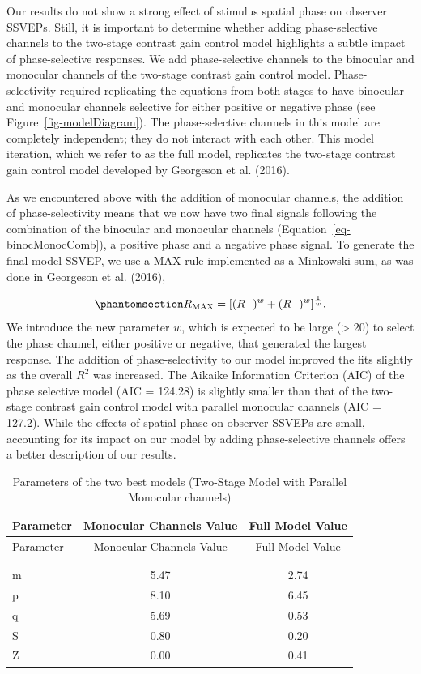\documentclass[
  12pt,
]{article}
\begin{document}
Our results do not show a strong effect of stimulus spatial phase on
observer SSVEPs. Still, it is important to determine whether adding
phase-selective channels to the two-stage contrast gain control model
highlights a subtle impact of phase-selective responses. We add
phase-selective channels to the binocular and monocular channels of the
two-stage contrast gain control model. Phase-selectivity required
replicating the equations from both stages to have binocular and
monocular channels selective for either positive or negative phase (see
Figure~\ref{fig-modelDiagram}). The phase-selective channels in this
model are completely independent; they do not interact with each other.
This model iteration, which we refer to as the full model, replicates
the two-stage contrast gain control model developed by Georgeson et al.
(2016).

As we encountered above with the addition of monocular channels, the
addition of phase-selectivity means that we now have two final signals
following the combination of the binocular and monocular channels
(Equation~\ref{eq-binocMonocComb}), a positive phase and a negative
phase signal. To generate the final model SSVEP, we use a MAX rule
implemented as a Minkowski sum, as was done in Georgeson et al. (2016),

\begin{equation}\phantomsection\label{eq-finalSum}{
R_\text{MAX} = [(R^+)^w+(R^-)^w]^{\frac{1}{w}}.
}\end{equation} We introduce the new parameter \(w\), which is expected
to be large (\textgreater{} 20) to select the phase channel, either
positive or negative, that generated the largest response. The addition
of phase-selectivity to our model improved the fits slightly as the
overall \(R^2\) was increased. The Aikaike Information Criterion (AIC)
of the phase selective model (AIC = 124.28) is slightly smaller than
that of the two-stage contrast gain control model with parallel
monocular channels (AIC = 127.2). While the effects of spatial phase on
observer SSVEPs are small, accounting for its impact on our model by
adding phase-selective channels offers a better description of our
results.

\begin{longtable}[]{@{}lcc@{}}
\toprule\noalign{}
Parameter & Monocular Channels Value & Full Model Value \\
\midrule\noalign{}
\endfirsthead
\toprule\noalign{}
Parameter & Monocular Channels Value & Full Model Value \\
\midrule\noalign{}
\endhead
\bottomrule\noalign{}
\tabularnewline
\caption{Parameters of the two best models (Two-Stage Model with
Parallel Monocular channels)}\label{tbl-modelParameters}\tabularnewline
\endlastfoot
m & 5.47 & 2.74 \\
p & 8.10 & 6.45 \\
q & 5.69 & 0.53 \\
S & 0.80 & 0.20 \\
Z & 0.00 & 0.41 \\
\end{longtable}
\end{document}
